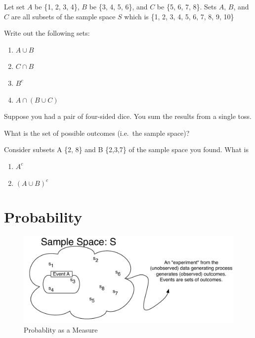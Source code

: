 \documentclass[]{book}
\providecommand{\tightlist}{%
  \setlength{\itemsep}{0pt}\setlength{\parskip}{0pt}}
\theoremstyle{definition}
\theoremstyle{definition}
\theoremstyle{definition}
\theoremstyle{remark}
\let\BeginKnitrBlock\begin \let\EndKnitrBlock\end
\begin{document}
\BeginKnitrBlock{example}[Sets]
\protect\hypertarget{exm:sets}{}{\label{exm:sets} {} }
Let set \(A\) be \{1, 2, 3, 4\}, \(B\) be \{3, 4, 5, 6\}, and \(C\) be
\{5, 6, 7, 8\}. Sets \(A\), \(B\), and \(C\) are all subsets of the
sample space \(S\) which is \{1, 2, 3, 4, 5, 6, 7, 8, 9, 10\}

Write out the following sets:

\begin{enumerate}
\def\labelenumi{\arabic{enumi}.}
\tightlist
\item
  \(A \cup B\)
\item
  \(C \cap B\)
\item
  \(B^c\)
\item
  \(A \cap (B \cup C)\)
\end{enumerate}
\EndKnitrBlock{example}

\BeginKnitrBlock{exercise}[Sets]
\protect\hypertarget{exr:sets1}{}{\label{exr:sets1} {} }

Suppose you had a pair of four-sided dice. You sum the results from a
single toss.

What is the set of possible outcomes (i.e.~the sample space)?

Consider subsets A \{2, 8\} and B \{2,3,7\} of the sample space you
found. What is

\begin{enumerate}
\def\labelenumi{\arabic{enumi}.}
\tightlist
\item
  \(A^c\)
\item
  \((A \cup B)^c\)
\end{enumerate}
\EndKnitrBlock{exercise}

\section{Probability}\label{probdef}

\begin{figure}
\centering
\includegraphics{images/probability.pdf}
\caption[\label{fig:prob-image}Probablity as a
Measure]{\label{fig:prob-image}Probablity as a Measure\footnotemark{}}
\end{figure}
\end{document}
